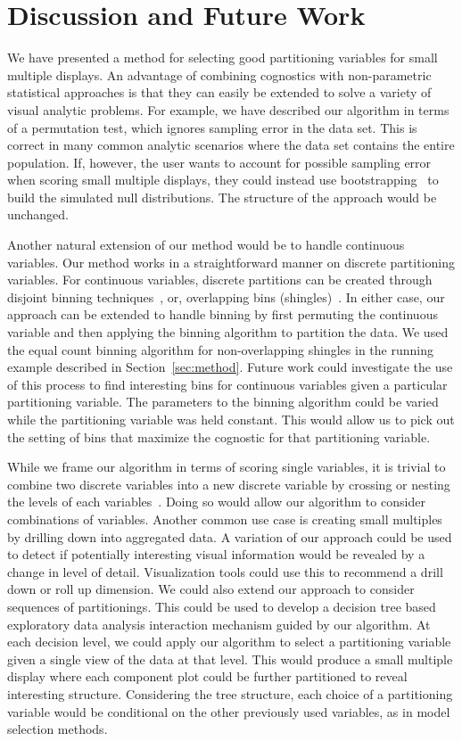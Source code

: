 \section{Discussion and Future Work}
\label{sec:discussion}
We have presented a method for selecting good partitioning variables for small multiple displays.
An advantage of combining cognostics with non-parametric statistical approaches is that they can easily be extended to solve a variety of visual analytic problems. For example, we have described our algorithm in terms of a permutation test, which ignores sampling error in the data set. This is correct in many common analytic scenarios where the data set contains the entire population. If, however, the user wants to account for possible sampling error when scoring small multiple displays, they could instead use bootstrapping~\cite{Efron1994} to build the simulated null distributions. The structure of the approach would be unchanged.

Another natural extension of our method would be to handle continuous variables. Our method works in a straightforward manner on discrete partitioning variables. For continuous variables, discrete partitions can be created through disjoint binning techniques~\cite{Freedman1981,Scott2009}, or, overlapping bins (shingles)~\cite{Becker1996}. In either case, our approach can be extended to handle binning by first permuting the continuous variable and then applying the binning algorithm to partition the data. We used the equal count binning algorithm for non-overlapping shingles in the running example described in Section~\ref{sec:method}. Future work could investigate the use of this process to find interesting bins for continuous variables given a particular partitioning variable. The parameters to the binning algorithm could be varied while the partitioning variable was held constant. This would allow us to pick out the setting of bins that maximize the cognostic for that partitioning variable. 

While we frame our algorithm in terms of scoring single variables, it is trivial to combine two discrete variables into a new discrete variable by crossing or nesting the levels of each variables~\cite{Wilkinson2005GG,Stolte2002}. Doing so would allow our algorithm to consider combinations of variables. 
Another common use case is creating small multiples by drilling down into aggregated data. A variation of our approach could be used to detect if potentially interesting visual information would be revealed by a change in level of detail. Visualization tools could use this to recommend a drill down or roll up dimension.
We could also extend our approach to consider sequences of partitionings. This could be used to develop a decision tree based exploratory data analysis interaction mechanism guided by our algorithm. At each decision level, we could apply our algorithm to select a partitioning variable given a single view of the data at that level. This would produce a small multiple display where each component plot could be further partitioned to reveal interesting structure. Considering the tree structure, each choice of a partitioning variable would be conditional on the other previously used variables, as in model selection methods. 

